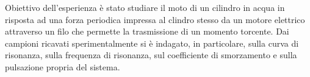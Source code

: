 Obiettivo dell'esperienza è stato studiare il moto di un cilindro in acqua in risposta ad una forza periodica impressa
al clindro stesso da un motore elettrico attraverso un filo che permette la trasmissione di un momento torcente.
Dai campioni ricavati sperimentalmente si è indagato, in particolare, sulla curva di risonanza,  sulla frequenza di risonanza, sul coefficiente di smorzamento e sulla pulsazione propria del sistema.

